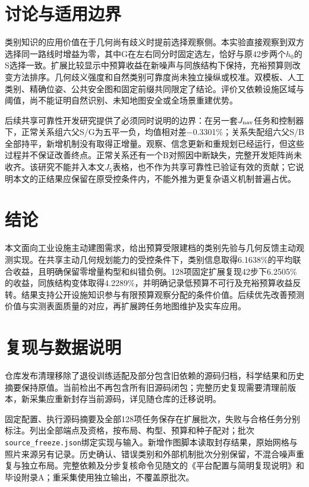 \documentclass[11pt,a4paper]{article}
\begin{document}
\hypertarget{ux8ba8ux8bbaux4e0eux9002ux7528ux8fb9ux754c}{%
\clearpage
\section{讨论与适用边界}\label{ux8ba8ux8bbaux4e0eux9002ux7528ux8fb9ux754c}}

类别知识的应用价值在于几何尚有歧义时提前选择观察侧。本实验直接观察到双方选择同一路线时增益为零，其中G在左右同分时固定选左，恰好与原42步两个\(h_0\)的S选择一致。扩展比较显示中预算收益在新噪声与同族结构下保持，充裕预算则改变方法排序。几何歧义强度和自然类别可靠度尚未独立操纵或校准。双模板、人工类别、精确位姿、公共安全图和固定前缀共同限定了结论。评价又依赖设施区域与阈值，尚不能证明自然识别、未知地图安全或全场景重建优势。

后续共享可靠性开发研究提供了必须同时说明的边界：在另一套\(J_{\rm nav}\)任务和控制器下，正常关系组六父S/G为五平一负，均值相对差−0.3301\%；关系失配组六父S/B全部持平，新增机制没有取得正增量。观察、信念更新和重规划已经运行，但这些过程并不保证改善终点。正常关系还有一个B对照因中断缺失，完整开发矩阵尚未收齐。该研究不能并入本文\(J_5\)表格，也不作为共享可靠性已验证有效的贡献；它说明本文的正结果应保留在原受控条件内，不能外推为更复杂语义机制普遍占优。

\hypertarget{ux7ed3ux8bba}{%
\section{结论}\label{ux7ed3ux8bba}}

本文面向工业设施主动建图需求，给出预算受限建档的类别先验与几何反馈主动观测实现。在共享主动几何规划能力的受控条件下，类别信息取得6.1638\%的平均联合收益，且明确保留零增量构型和纠错负例。128项固定扩展复现42步下6.2505\%的收益，同族结构变体取得4.2289\%，并明确记录低预算不可行及充裕预算收益反转。结果支持公开设施知识参与有限预算观察分配的条件价值。后续优先改善预测价值与实测表面质量的对应，再扩展跨任务地图维护及实车应用。

\hypertarget{ux590dux73b0ux4e0eux6570ux636eux8bf4ux660e}{%
\section*{复现与数据说明}\label{ux590dux73b0ux4e0eux6570ux636eux8bf4ux660e}}

仓库发布清理移除了退役训练适配及部分包含旧依赖的源码归档，科学结果和历史摘要保持原值。当前检出不再包含所有旧源码闭包；完整历史复现需要清理前版本，新采集应重新封存当前源码，详见随仓库的迁移说明。

固定配置、执行源码摘要及全部128项任务保存在扩展批次，失败与合格任务分别标注。列出全部端点及资格，按布局、构型、预算和种子配对；批次\texttt{source\_freeze.json}绑定实现与输入。新增作图脚本读取封存结果，原始网格与照片来源另有记录。历史确认、错误类别和外部机制批次分别保留，不混合噪声重复与独立布局。完整依赖及分步复核命令见随文的《平台配置与简明复现说明》和毕设附录A；重采集使用独立输出，不覆盖原批次。
\end{document}
